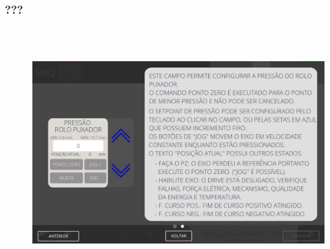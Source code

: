 \newpage
\thispagestyle{fancy}
\vspace*{\fill}
\subsubsection{\small{???}}
\begin{figure}[h]
  \centering
  \includegraphics[width=576px,height=360px]{src/imagesFlexo/03-feeder/settings/e-2.png}
   \label{}
\end{figure}
\vspace*{\fill}
